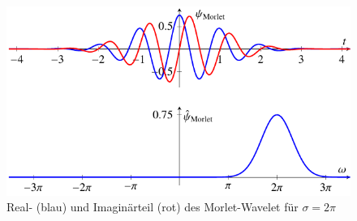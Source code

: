 \begin{figure}
	\centering
	\includegraphics{papers/complex/images/morlet.pdf}
	\caption{Real- (blau) und Imaginärteil (rot) des Morlet-Wavelet für $\sigma = 2\pi$ \label{complex:morlet}}
\end{figure}